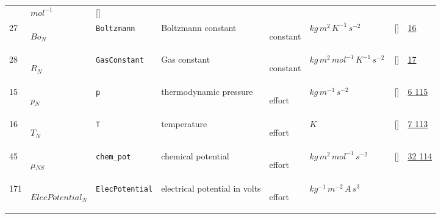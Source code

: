 \begin{longtable}{|p{1cm}|p{3cm}|p{3cm}|p{7cm}|p{3.0cm}|p{3cm}|p{2cm}|p{1cm}|}
             & $ mol^{-1} \, $
             & []
             & \\
    27
             & \hypertarget{"v:27"}{ $ {Bo}{_{N}} $}
             & \verb|Boltzmann|
             & Boltzmann constant
             & \begin{lay}constant \end{lay}
             & $ kg \,m^{2} \,K^{-1} \,s^{-2} \, $
             & []
             & \hyperlink{"e:16"}{ 16 }
                 \\
    28
             & \hypertarget{"v:28"}{ $ {R}{_{N}} $}
             & \verb|GasConstant|
             & Gas constant
             & \begin{lay}constant \end{lay}
             & $ kg \,m^{2} \,mol^{-1} \,K^{-1} \,s^{-2} \, $
             & []
             & \hyperlink{"e:17"}{ 17 }
                 \\
    15
             & \hypertarget{"v:15"}{ $ {p}{_{N}} $}
             & \verb|p|
             & thermodynamic pressure
             & \begin{lay}effort \end{lay}
             & $ kg \,m^{-1} \,s^{-2} \, $
             & []
             & \hyperlink{"e:6"}{ 6 }
                 \hyperlink{"e:115"}{ 115 }
                 \\
    16
             & \hypertarget{"v:16"}{ $ {T}{_{N}} $}
             & \verb|T|
             & temperature
             & \begin{lay}effort \end{lay}
             & $ K \, $
             & []
             & \hyperlink{"e:7"}{ 7 }
                 \hyperlink{"e:113"}{ 113 }
                 \\
    45
             & \hypertarget{"v:45"}{ $ {\mu}{_{{N S}}} $}
             & \verb|chem_pot|
             & chemical potential
             & \begin{lay}effort \end{lay}
             & $ kg \,m^{2} \,mol^{-1} \,s^{-2} \, $
             & []
             & \hyperlink{"e:32"}{ 32 }
                 \hyperlink{"e:114"}{ 114 }
                 \\
    171
             & \hypertarget{"v:171"}{ $ {ElecPotential}{_{N}} $}
             & \verb|ElecPotential|
             & electrical potential in volts
             & \begin{lay}effort \end{lay}
             & $ kg^{-1} \,m^{-2} \,A \,s^{3} \, $

\end{longtable}
